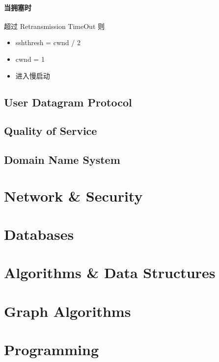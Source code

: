\documentclass[11pt,journal,compsoc]{IEEEtran}
\begin{document}
\paragraph{当拥塞时}

超过 Retransmission TimeOut 则

\begin{itemize}
    \item sshthresh = cwnd / 2
    \item cwnd = 1
    \item 进入慢启动
\end{itemize}


\subsection{User Datagram Protocol}





\subsection{Quality of Service}


\subsection{Domain Name System}




\section{Network \& Security}


\section{Databases}


\section{Algorithms \& Data Structures}


\section{Graph Algorithms}


\section{Programming}
\end{document}
